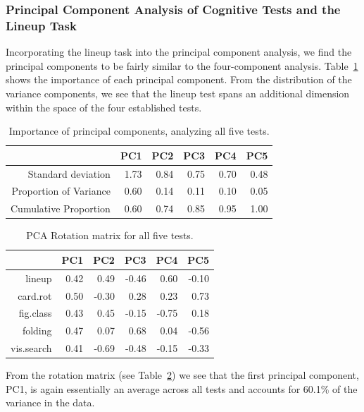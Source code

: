 \documentclass[11pt]{isuthesis}\usepackage[]{graphicx}\usepackage[]{color}
\begin{document}
\subsubsection{Principal Component Analysis of Cognitive Tests and the Lineup Task }
Incorporating the lineup task into the principal component analysis, we find the principal components to be fairly similar to the four-component analysis. 
Table~\ref{tab:PCAvariance5} shows the importance of each principal component. From the distribution of the variance components, we see that the lineup test  spans an additional dimension within the space of the four established tests. 
\begin{table}[ht]
\centering
\caption{Importance of principal components, analyzing all five tests.\label{tab:PCAvariance5}} 
{\footnotesize
\begin{tabular}{rrrrrr}
  \hline
 & PC1 & PC2 & PC3 & PC4 & PC5 \\ 
  \hline
Standard deviation & 1.73 & 0.84 & 0.75 & 0.70 & 0.48 \\ 
  Proportion of Variance & 0.60 & 0.14 & 0.11 & 0.10 & 0.05 \\ 
  Cumulative Proportion & 0.60 & 0.74 & 0.85 & 0.95 & 1.00 \\ 
   \hline
\end{tabular}
}
\end{table}


\begin{table}[ht]
\centering
\caption{PCA Rotation matrix for all five tests. 
             \label{tab:PCArotation5}} 
\begin{tabular}{rrrrrr}
  \hline
 & PC1 & PC2 & PC3 & PC4 & PC5 \\ 
  \hline
lineup & 0.42 & 0.49 & -0.46 & 0.60 & -0.10 \\ 
  card.rot & 0.50 & -0.30 & 0.28 & 0.23 & 0.73 \\ 
  fig.class & 0.43 & 0.45 & -0.15 & -0.75 & 0.18 \\ 
  folding & 0.47 & 0.07 & 0.68 & 0.04 & -0.56 \\ 
  vis.search & 0.41 & -0.69 & -0.48 & -0.15 & -0.33 \\ 
   \hline
\end{tabular}
\end{table}

From the rotation matrix (see Table~\ref{tab:PCArotation5}) we see that  
the first principal component, PC1, is again essentially an average across all tests and accounts for 60.1\% of the variance in the data. 
\end{document}
